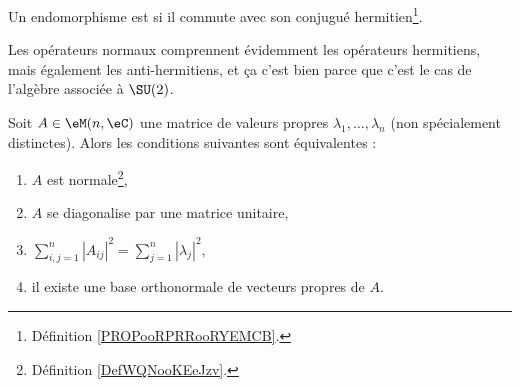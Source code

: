 \begin{definition}  \label{DefWQNooKEeJzv}
    Un endomorphisme est  si il commute avec son conjugué hermitien\footnote{Définition \ref{PROPooRPRRooRYEMCB}.}.
\end{definition}

Les opérateurs normaux comprennent évidemment les opérateurs hermitiens, mais également les anti-hermitiens, et ça c'est bien parce que c'est le cas de l'algèbre associée à \( \SU(2)\).

\begin{theorem}    \label{ThogammwA}
	Soit \( A\in\eM(n,\eC)\) une matrice de valeurs propres \( \lambda_1,\ldots, \lambda_n\) (non spécialement distinctes). Alors les conditions suivantes sont équivalentes :
	\begin{enumerate}
		\item   \label{ItemJZhFPSi}
            \( A\) est normale\footnote{Définition \ref{DefWQNooKEeJzv}.},
		\item   \label{ItemJZhFPSii}
		      \( A\) se diagonalise par une matrice unitaire,
          \item   \label{ITEMooIIQTooQORrXP}
		      \( \sum_{i,j=1}^n| A_{ij} |^2=\sum_{j=1}^n| \lambda_j |^2\),
          \item   \label{ITEMooJRKSooNfsQJb}
		      il existe une base orthonormale de vecteurs propres de \( A\).
	\end{enumerate}
\end{theorem}

